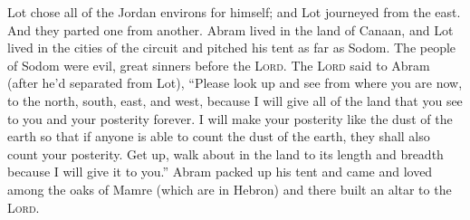 \begin{inparaenum}
     Lot chose all of the Jordan environs for himself; and Lot journeyed from the east. And they parted one from another.%
     Abram lived in the land of Canaan, and Lot lived in the cities of the circuit and pitched his tent as far as Sodom.%
     The people of Sodom were evil, great sinners before the \textsc{Lord}.%
     The \textsc{Lord} said to Abram (after he'd separated from Lot), ``Please look up and see from where you are now, to the north, south, east, and west,%
     because I will give all of the land that you see to you and your posterity forever.%
     I will make your posterity like the dust of the earth so that if anyone is able to count the dust of the earth, they shall also count your posterity.%
     Get up, walk about in the land to its length and breadth because I will give it to you.''%
     Abram packed up his tent and came and loved among the oaks of Mamre (which are in Hebron) and there built an altar to the \textsc{Lord}.%
\end{inparaenum}
